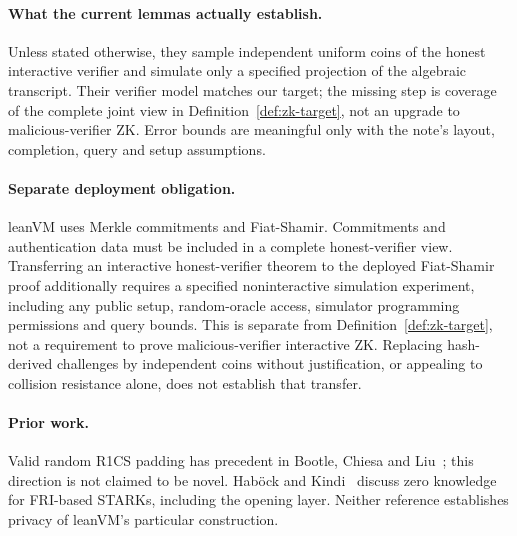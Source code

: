 \paragraph{What the current lemmas actually establish.} Unless stated otherwise, they sample independent uniform coins of the honest interactive verifier and simulate only a specified projection of the algebraic transcript. Their verifier model matches our target; the missing step is coverage of the complete joint view in Definition~\ref{def:zk-target}, not an upgrade to malicious-verifier ZK. Error bounds are meaningful only with the note's layout, completion, query and setup assumptions.

\paragraph{Separate deployment obligation.} leanVM uses Merkle commitments and Fiat-Shamir. Commitments and authentication data must be included in a complete honest-verifier view. Transferring an interactive honest-verifier theorem to the deployed Fiat-Shamir proof additionally requires a specified noninteractive simulation experiment, including any public setup, random-oracle access, simulator programming permissions and query bounds. This is separate from Definition~\ref{def:zk-target}, not a requirement to prove malicious-verifier interactive ZK. Replacing hash-derived challenges by independent coins without justification, or appealing to collision resistance alone, does not establish that transfer.


\paragraph{Prior work.} Valid random R1CS padding has precedent in Bootle, Chiesa and Liu~\cite{bcl}; this direction is not claimed to be novel. Hab\"ock and Kindi~\cite{hk} discuss zero knowledge for FRI-based STARKs, including the opening layer. Neither reference establishes privacy of leanVM's particular construction.
